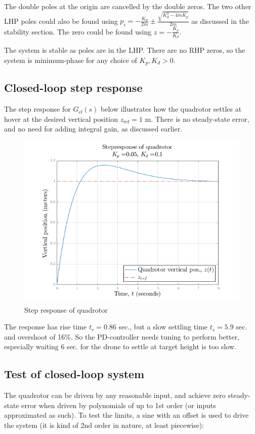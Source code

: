 \documentclass[a4paper]{report}
\begin{document}
The double poles at the origin are cancelled by the double zeros. 
The two other \gls{LHP} poles could also be found using $p_i = -\frac{K_d}{2m} \pm \frac{\sqrt{K_d^2 - 4 m K_p}}{2m}$ as discussed in the stability section. 
The zero could be found using $z=-\frac{K_p}{K_d}$.

The system is stable as poles are in the \gls{LHP}.
There are no \gls{RHP} zeros, so the system is minimum-phase for any choice of $K_p, K_d > 0$.


\subsection{Closed-loop step response}
The step response for $G_{cl}(s)$ below illustrates how the quadrotor settles at hover at the desired vertical position $z_\text{ref}=1$ \si{\meter}. There is no steady-state error, and no need for adding integral gain, as discussed earlier.


\begin{figure}[H]
\centering
\includegraphics[width=12cm]{img/step_1d.png}
\caption{Step response of quadrotor\label{fig:step_1d}}
\end{figure}

The response has rise time $t_r = 0.86$ sec., but a slow settling time $t_s = 5.9$ sec. and overshoot of 16\%. 
So the PD-controller needs tuning to perform better, especially waiting 6 sec. for the drone to settle at target height is too slow.




\subsection{Test of closed-loop system}
The quadrotor can be driven by any reasonable input, and achieve zero steady-state error when driven by polynomials of up to 1st order (or inputs approximated as such). To test the limits, a sine with an offset is used to drive the system (it is kind of 2nd order in nature, at least piecewise): \\
\end{document}
